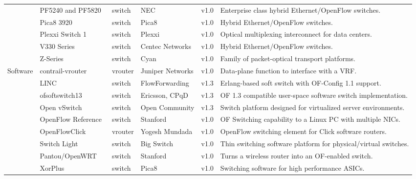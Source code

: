 {\begin{table}[!htp]
\begin{center}
\begin{tabularx}{\linewidth}{p{1.2cm}p{3.1cm}p{0.9cm}p{2.4cm}p{0.8cm}X}
& PF5240 and PF5820~\cite{nec2013-2} & switch & NEC & v1.0 & Enterprise class hybrid Ethernet/OpenFlow switches. \\\cline{2-6}
& Pica8 3920~\cite{pica8opennetworking2013} & switch & Pica8 & v1.0 & Hybrid Ethernet/OpenFlow switches. \\\cline{2-6}
& Plexxi Switch 1~\cite{plexxi2013} & switch & Plexxi & v1.0 & Optical multiplexing interconnect for data centers. \\\cline{2-6}
& V330 Series~\cite{centecnetworks2013} & switch & Centec Networks & v1.0 & Hybrid Ethernet/OpenFlow switches. \\\cline{2-6}
& Z-Series~\cite{cyan2013} & switch & Cyan & v1.0 & Family of packet-optical transport platforms.\\
\hline
\multirow{9}{*}{Software} 
& contrail-vrouter~\cite{networks2013} & vrouter &  Juniper Networks & v1.0 & Data-plane function to interface with a VRF.\\\cline{2-6}
& LINC~\cite{flowforwarding2013,rutka2013} & switch &  FlowForwarding & v1.3 & Erlang-based soft switch with OF-Config 1.1 support.\\\cline{2-6}
& ofsoftswitch13~\cite{cpqd2013} & switch & Ericsson, CPqD & v1.3 & OF 1.3 compatible user-space software switch implementation. \\\cline{2-6}
& Open vSwitch~\cite{listofcontributors2013,pfaff2009} & switch & Open Community & v1.3  & Switch platform designed for virtualized server environments.  \\\cline{2-6}
& OpenFlow Reference~\cite{openflowcommunity2009} & switch & Stanford & v1.0 & OF Switching capability to a Linux PC with multiple NICs. \\\cline{2-6}
& OpenFlowClick~\cite{mundada2009} & vrouter & Yogesh Mundada & v1.0 & OpenFlow switching element for Click software routers.\\\cline{2-6}
& Switch Light~\cite{bigswitchnetworks2013} & switch & Big Switch & v1.0  & Thin switching software platform for physical/virtual switches. \\\cline{2-6}
& Pantou/OpenWRT~\cite{yiakoumis2011} & switch & Stanford  & v1.0 & Turns a wireless router into an OF-enabled switch. \\\cline{2-6}
& XorPlus~\cite{shang2014} & switch &  Pica8 & v1.0 & Switching software for high performance ASICs.\\
\hline
\end{tabularx}
\end{center}
\end{table}
}

